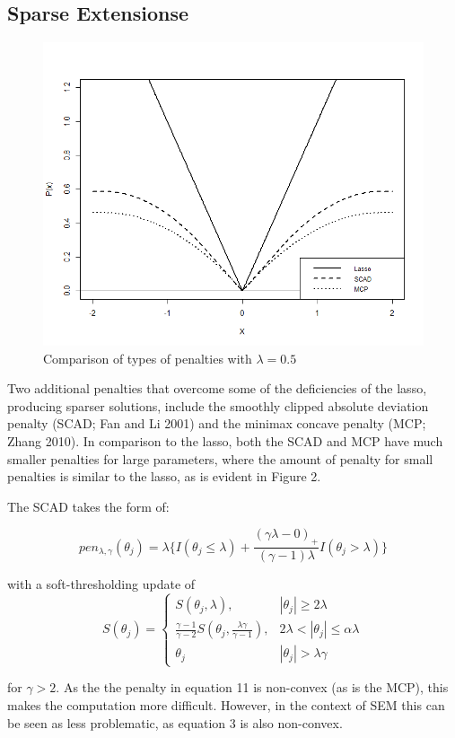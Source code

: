 \documentclass[article]{jss}
\begin{document}
\subsection{Sparse Extensionse}\label{sparse-extensionse}

\begin{figure}
    \centering
    \includegraphics[width=.5\linewidth]{figs/penalties}
    \caption{Comparison of types of penalties with $\lambda=0.5$}
\end{figure}

Two additional penalties that overcome some of the deficiencies of the
lasso, producing sparser solutions, include the smoothly clipped
absolute deviation penalty (SCAD; Fan and Li 2001) and the minimax
concave penalty (MCP; Zhang 2010). In comparison to the lasso, both the
SCAD and MCP have much smaller penalties for large parameters, where the
amount of penalty for small penalties is similar to the lasso, as is
evident in Figure 2.

The SCAD takes the form of:

\[
pen_{\lambda,\gamma}(\theta_{j}) = \lambda \big\{I(\theta_{j}\leq\lambda) + \frac{(\gamma \lambda-0)_{+}}{(\gamma-1)\lambda}I(\theta_{j}>\lambda)\big\}
\]

with a soft-thresholding update of \[
S(\theta_{j})= 
\begin{cases}
S(\theta_{j},\lambda),&  |\theta_{j}| \geq 2\lambda\\
\frac{\gamma-1}{\gamma-2}S(\theta_{j},\frac{\lambda\gamma}{\gamma-1}),              & 2\lambda < |\theta_{j}|\leq\alpha\lambda\\
\theta_{j} & |\theta_{j}| > \lambda \gamma
\end{cases}
\]

for \(\gamma > 2\). As the the penalty in equation 11 is non-convex (as
is the MCP), this makes the computation more difficult. However, in the
context of SEM this can be seen as less problematic, as equation 3 is
also non-convex.
\end{document}
